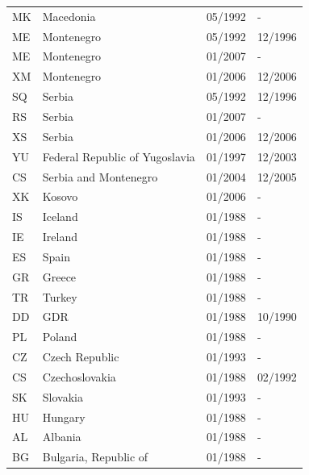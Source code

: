 \begin{small}
\begin{longtable}{p{0.5cm}p{9cm}p{2cm}p{2cm}}
MK	&	Macedonia	&	05/1992	&	-	\\

ME	&	Montenegro	&	05/1992	&	12/1996	\\

ME	&	Montenegro	&	01/2007	&	-	\\

XM	&	Montenegro	&	01/2006	&	12/2006	\\

SQ	&	Serbia	&	05/1992	&	12/1996	\\

RS	&	Serbia	&	01/2007	&	-	\\

XS	&	Serbia	&	01/2006	&	12/2006	\\

YU	&	Federal Republic of Yugoslavia	&	01/1997	&	12/2003	\\

CS	&	Serbia and Montenegro	&	01/2004	&	12/2005	\\

XK	&	Kosovo	&	01/2006	&	-	\\

IS	&	Iceland	&	01/1988	&	-	\\

IE	&	Ireland	&	01/1988	&	-	\\

ES	&	Spain	&	01/1988	&	-	\\

GR	&	Greece	&	01/1988	&	-	\\

TR	&	Turkey	&	01/1988	&	-	\\

DD	&	GDR	&	01/1988	&	10/1990	\\

PL	&	Poland	&	01/1988	&	-	\\

CZ	&	Czech Republic	&	01/1993	&	-	\\

CS	&	Czechoslovakia	&	01/1988	&	02/1992	\\

SK	&	Slovakia	&	01/1993	&	-	\\

HU	&	Hungary	&	01/1988	&	-	\\

AL	&	Albania	&	01/1988	&	-	\\

BG	&	Bulgaria, Republic of	&	01/1988	&	-	\\


\end{longtable}
\end{small}
